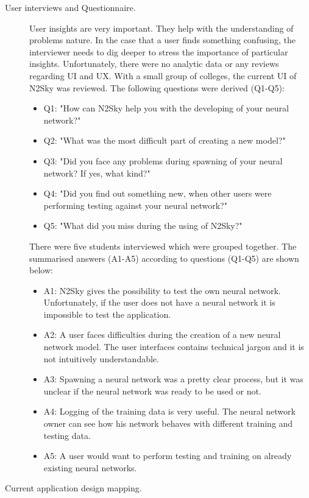 \begin{description}
\item[User interviews and Questionnaire.]
User insights are very important. They help with the understanding of problems nature. In the case that a user finds something confusing, the interviewer needs to dig deeper to stress the importance of particular insights. Unfortunately, there were no analytic data or any reviews regarding UI and UX. With a small group of colleges, the current UI of N2Sky was reviewed. 
The following questions were derived (Q1-Q5): 


\begin{itemize}
\item Q1: "How can N2Sky help you with the developing of your neural network?"
\item Q2: "What was the most difficult part of creating a new model?"
\item Q3: "Did you face any problems during spawning of your neural network? If yes, what kind?"
\item Q4: "Did you find out something new, when other users were performing testing against your neural network?"
\item Q5: "What did you miss during the using of N2Sky?"
\end{itemize}    

There were five students interviewed which were grouped together. The summarised answers (A1-A5) according to questions (Q1-Q5) are shown below: 

\begin{itemize}
\item A1: N2Sky gives the possibility to test the own neural network. Unfortunately, if the user does not have a neural network it is impossible to test the application.   
\item A2:  A user faces difficulties during the creation of a new neural network model. The user interfaces contains technical jargon and it is not intuitively understandable.  
\item A3:  Spawning a neural network was a pretty clear process, but it was unclear if the neural network was ready to be used or not.
\item A4:  Logging of the training data is very useful. The neural network owner can see how his network behaves with different training and testing data.
\item A5:  A user would want to perform testing and training on already existing neural networks. 
\end{itemize}    


\item[Current application design mapping.]


\end{description}

